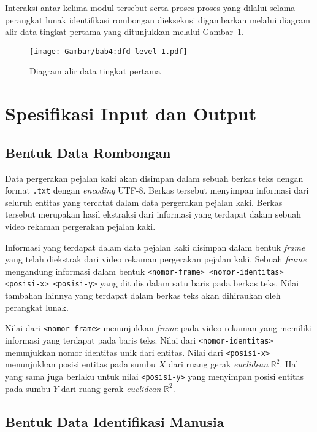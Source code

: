 Interaksi antar kelima modul tersebut serta proses-proses yang dilalui selama perangkat lunak identifikasi rombongan dieksekusi digambarkan melalui diagram alir data tingkat pertama yang ditunjukkan melalui Gambar~\ref{bab4:dfd-level-1}.

\begin{figure}[h]
    \centering
    \texttt{[image: Gambar/bab4:dfd-level-1.pdf]}
    \caption{Diagram alir data tingkat pertama}
    \label{bab4:dfd-level-1}
\end{figure}

\section{Spesifikasi Input dan Output}
\label{sec:input-output}

\subsection{Bentuk Data Rombongan}
\label{sec:input}

Data pergerakan pejalan kaki akan disimpan dalam sebuah berkas teks dengan format \texttt{.txt} dengan \textit{encoding} UTF-8. Berkas tersebut menyimpan informasi dari seluruh entitas yang tercatat dalam data pergerakan pejalan kaki. Berkas tersebut merupakan hasil ekstraksi dari informasi yang terdapat dalam sebuah video rekaman pergerakan pejalan kaki.

Informasi yang terdapat dalam data pejalan kaki disimpan dalam bentuk \textit{frame} yang telah diekstrak dari video rekaman pergerakan pejalan kaki. Sebuah \textit{frame} mengandung informasi dalam bentuk \texttt{<nomor-frame> <nomor-identitas> <posisi-x> <posisi-y>} yang ditulis dalam satu baris pada berkas teks. Nilai tambahan lainnya yang terdapat dalam berkas teks akan dihiraukan oleh perangkat lunak.

Nilai dari \texttt{<nomor-frame>} menunjukkan \textit{frame} pada video rekaman yang memiliki informasi yang terdapat pada baris teks. Nilai dari \texttt{<nomor-identitas>} menunjukkan nomor identitas unik dari entitas. Nilai dari \texttt{<posisi-x>} menunjukkan posisi entitas pada sumbu $X$ dari ruang gerak \textit{euclidean} $\mathbb{R}^2$. Hal yang sama juga berlaku untuk nilai \texttt{<posisi-y>} yang menyimpan posisi entitas pada sumbu $Y$ dari ruang gerak \textit{euclidean} $\mathbb{R}^2$.

\subsection{Bentuk Data Identifikasi Manusia}
\label{sec:human-identification}

